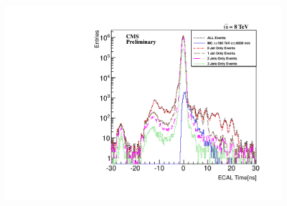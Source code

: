 \paragraph*{}\mbox{}\\
\begin{minipage}{\linewidth} 
\begin{center}
\centering
\includegraphics[height=0.65\textwidth, width=0.8\textwidth]{THESISPLOTS/Photon_SeedXtalTime_Distribution_VsJetMultiplicity.pdf}
\label{fig:JetsTimePlot}
\end{center}
\end{minipage}

